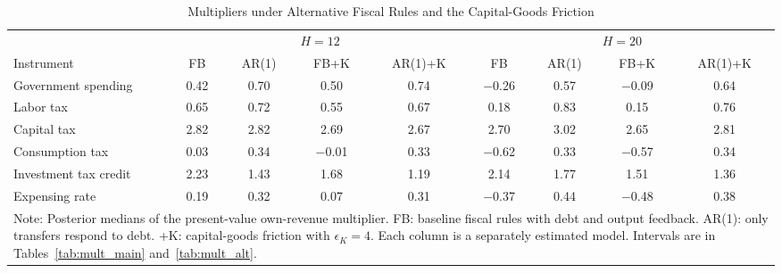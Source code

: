 \begin{table}[ht]
\centering
\caption{Multipliers under Alternative Fiscal Rules and the Capital-Goods Friction}
\label{tab:mult_compare}
\begin{tabular}{lcccccccc}
\hline\hline
 & \multicolumn{4}{c}{$H=12$} & \multicolumn{4}{c}{$H=20$} \\
\cmidrule(lr){2-5}\cmidrule(lr){6-9}
Instrument & FB & AR(1) & FB+K & AR(1)+K & FB & AR(1) & FB+K & AR(1)+K \\
\hline
Government spending      & 0.42 & 0.70 & 0.50 & 0.74 & $-$0.26 & 0.57 & $-$0.09 & 0.64 \\
Labor tax                & 0.65 & 0.72 & 0.55 & 0.67 & 0.18 & 0.83 & 0.15 & 0.76 \\
Capital tax              & 2.82 & 2.82 & 2.69 & 2.67 & 2.70 & 3.02 & 2.65 & 2.81 \\
Consumption tax          & 0.03 & 0.34 & $-$0.01 & 0.33 & $-$0.62 & 0.33 & $-$0.57 & 0.34 \\
Investment tax credit    & 2.23 & 1.43 & 1.68 & 1.19 & 2.14 & 1.77 & 1.51 & 1.36 \\
Expensing rate           & 0.19 & 0.32 & 0.07 & 0.31 & $-$0.37 & 0.44 & $-$0.48 & 0.38 \\
\hline\hline
\multicolumn{9}{p{0.95\textwidth}}{\footnotesize Note: Posterior medians of the present-value own-revenue multiplier. FB: baseline fiscal rules with debt and output feedback. AR(1): only transfers respond to debt. +K: capital-goods friction with $\epsilon_K = 4$. Each column is a separately estimated model. Intervals are in Tables~\ref{tab:mult_main} and~\ref{tab:mult_alt}.}
\end{tabular}
\end{table}
